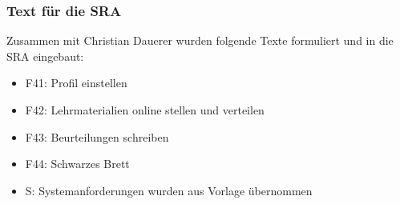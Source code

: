 \begin{frame} %
  \frametitle{Text für die SRA} %
  
  Zusammen mit Christian Dauerer wurden folgende Texte formuliert und in die SRA eingebaut:
  \begin{block}{}
  	\begin{itemize}
  		\item F41: Profil einstellen
  		\item F42: Lehrmaterialien online stellen und verteilen
  		\item F43: Beurteilungen schreiben
  		\item F44: Schwarzes Brett
  		\newline
  		\item S: Systemanforderungen wurden aus Vorlage übernommen
  	\end{itemize}
  \end{block}

\end{frame}
